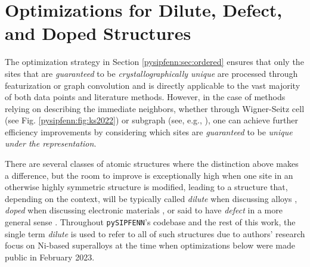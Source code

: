 \section{Optimizations for Dilute, Defect, and Doped Structures} \label{pysipfenn:sec:dilute}

The optimization strategy in Section \ref{pysipfenn:sec:ordered} ensures that only the sites that are \emph{guaranteed} to be \emph{crystallographically unique} are processed through featurization or graph convolution and is directly applicable to the vast majority of both data points and literature methods. However, in the case of methods relying on describing the immediate neighbors, whether through Wigner-Seitz cell (see Fig. \ref{pysipfenn:fig:ks2022}) or subgraph (see, e.g., \cite{Chen2019GraphCrystals}), one can achieve further efficiency improvements by considering which sites are \emph{guaranteed} to be \emph{unique under the representation}.

There are several classes of atomic structures where the distinction above makes a difference, but the room to improve is exceptionally high when one site in an otherwise highly symmetric structure is modified, leading to a structure that, depending on the context, will be typically called \emph{dilute} when discussing alloys \cite{Chong2021CorrelationAlloys}, \emph{doped} when discussing electronic materials \cite{Chen2022InteractionStudy}, or said to have \emph{defect} in a more general sense \cite{Castleton2009DensitySupercells}. Throughout \texttt{pySIPFENN}'s codebase and the rest of this work, the single term \emph{dilute} is used to refer to all of such structures due to authors' research focus on Ni-based superalloys at the time when optimizations below were made public in February 2023.

